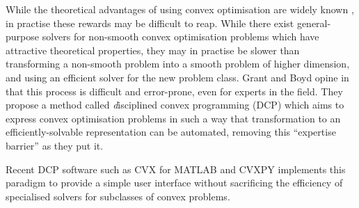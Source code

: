 While the theoretical advantages of using convex optimisation are widely known
\cite{Luo06}, in practise these rewards may be difficult to reap. While there
exist general-purpose solvers for non-smooth convex optimisation problems which
have attractive theoretical properties, they may in practise be slower than
transforming a non-smooth problem into a smooth problem of higher dimension,
and using an efficient solver for the new problem class. Grant and Boyd opine
in \cite{Grant08} that this process is difficult and error-prone, even for
experts in the field. They propose a method called {\emph disciplined convex
programming} (DCP) \cite{Grant06} which aims to express convex optimisation
problems in such a way that transformation to an efficiently-solvable
representation can be automated, removing this ``expertise barrier'' as they
put it.

Recent DCP software such as CVX for MATLAB \cite{CVX} and CVXPY \cite{CVXPY}
implements this paradigm to provide a simple user interface without sacrificing
the efficiency of specialised solvers for subclasses of convex problems.
